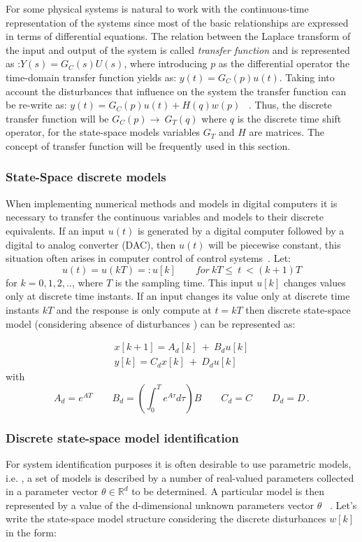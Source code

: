 For some physical systems is natural to work with the continuous-time representation of the systems since most of the basic relationships are expressed in terms of differential equations. The relation between the Laplace transform of the input and output of the system  is called \textit{transfer function} and is represented as :$Y(s)=G_C(s)U(s)$, where introducing $p$ as the differential operator the time-domain transfer function yields as:  $y(t)=G_C(p)u(t)$. Taking into account the disturbances that influence on the system the transfer function can be re-write as: $y(t)=G_C(p)u(t)+H(q)w(p)$ ~\cite[Chapter~2]{Ljung1987}. Thus, the discrete transfer function will be $G_C(p) \rightarrow ~G_T(q)$  where $q$ is the discrete time shift operator, for the state-space models variables $G_T$ and $H$ are matrices. The concept of transfer function will be frequently used in this section.
\smallskip


\subsubsection{State-Space discrete models}
When implementing numerical methods and models in digital computers it is necessary to transfer the continuous variables and models to their discrete equivalents. If an input $u(t)$ is generated by a digital computer followed by a digital to analog converter (DAC), then $u(t)$ will be piecewise constant, this situation often arises in computer control of control systems~\cite[Chapter~4]{Chen1999}. Let:
\begin{equation}
u(t)=u(kT)=:u[k] \qquad for\: kT\leq~t~<(k+1)T
\end{equation}
for $k=0,1,2,..$, where $T$ is the sampling time. This input $u[k]$ changes values only at discrete time instants. If an input changes its value only at discrete time instants $kT$ and the response is only compute at $t=kT$ then discrete state-space model (considering absence of disturbances ) can be represented as:


 \begin{align}
x[k+1]=A_d[k]~+~B_du[k]\\
y[k]=C_dx[k]~+~D_du[k]
\label{SS_dscrt}
\end{align}
with
\begin{equation}
A_d=e^{AT}\qquad B_d=\left(\int_{0}^{T} e^{A\tau}d\tau\right)B \qquad C_d=C \qquad D_d=D \, .
\end{equation}



\subsubsection{Discrete state-space model identification}
\label{Disc_SS_ident}
For system identification purposes it is often desirable to use parametric models, i.e. , a set of models is described by a number of real-valued parameters collected in a parameter  vector $\theta\in \mathbb{R}^d$ to be determined. A particular model is then represented by a value of the d-dimensional unknown parameters vector $\theta$ ~\cite[Chapter~2]{McKelvey1995}. Let's write the state-space model structure considering the discrete disturbances $w[k]$ in the form:

